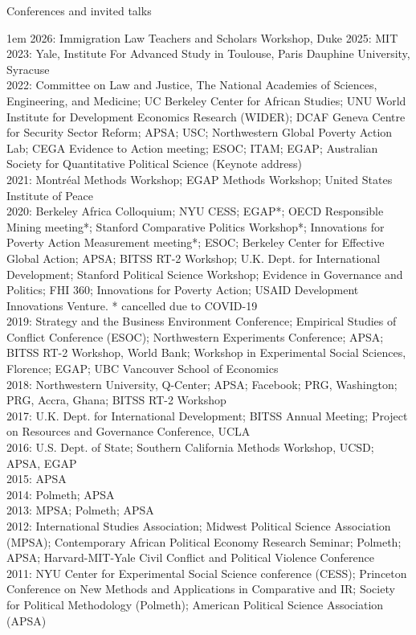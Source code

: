 \documentclass[10.9pt]{article}
\makeatletter
\newcommand\donotbreakhere{\par\nobreak\@afterheading\vspace{1em}}
\newenvironment{indnt}{\begin{adjustwidth}{1em}{}}{\end{adjustwidth}}
\makeatother
\begin{document}
{\large Conferences and invited talks} \donotbreakhere  %
\begin{indnt}
2026: Immigration Law Teachers and Scholars Workshop, Duke
2025: MIT\\[.35em]
2023: Yale, Institute For Advanced Study in Toulouse, Paris Dauphine University, Syracuse\\[.35em]
2022: Committee on Law and Justice, The National Academies of Sciences, Engineering, and Medicine; UC Berkeley Center for African Studies; UNU World Institute for Development Economics Research (WIDER); DCAF Geneva Centre for Security Sector Reform; APSA; USC; Northwestern Global Poverty Action Lab; CEGA Evidence to Action meeting; ESOC; ITAM; EGAP; Australian Society for Quantitative Political Science (Keynote address)\\[.35em]
2021: Montr{\'e}al Methods Workshop; EGAP Methods Workshop; United States Institute of Peace \\[.35em]
2020: Berkeley Africa Colloquium; NYU CESS; EGAP*; OECD Responsible Mining meeting*; Stanford Comparative Politics Workshop*; Innovations for Poverty Action Measurement meeting*; ESOC; Berkeley Center for Effective Global Action; APSA; BITSS RT-2 Workshop; U.K. Dept. for International Development; Stanford Political Science Workshop; Evidence in Governance and Politics; FHI 360; Innovations for Poverty Action; USAID Development Innovations Venture. * cancelled due to COVID-19 \\[.35em]
2019: Strategy and the Business Environment Conference; Empirical Studies of Conflict Conference (ESOC); Northwestern Experiments Conference; APSA; BITSS RT-2 Workshop, World Bank; Workshop in Experimental Social Sciences, Florence; EGAP; UBC Vancouver School of Economics\\[.35em]
2018: Northwestern University, Q-Center; APSA; Facebook; PRG, Washington; PRG, Accra, Ghana; BITSS RT-2 Workshop\\[.35em]
2017: U.K. Dept. for International Development; BITSS Annual Meeting; Project on Resources and Governance Conference, UCLA \\[.35em]
2016: U.S. Dept. of State; Southern California Methods Workshop, UCSD; APSA, EGAP \\[.35em]
2015:  APSA \\[.35em]
2014:  Polmeth;  APSA  \\[.35em]
2013:  MPSA; Polmeth;  APSA    \\[.35em]
2012:  International Studies Association; Midwest Political Science Association (MPSA); Contemporary African Political Economy Research Seminar; Polmeth; APSA; Harvard-MIT-Yale Civil Conflict and Political Violence Conference    \\[.35em]
2011:  NYU Center for Experimental Social Science conference (CESS); Princeton Conference on New Methods and Applications in Comparative and IR; Society for Political Methodology (Polmeth);  American Political Science Association (APSA)


\end{indnt}
\end{document}

